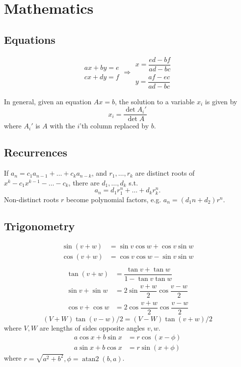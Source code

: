 
\chapter{Mathematics}

\section{Equations}


\[\begin{aligned}ax+by=e\\cx+dy=f\end{aligned}
\Rightarrow
\begin{aligned}x=\dfrac{ed-bf}{ad-bc}\\y=\dfrac{af-ec}{ad-bc}\end{aligned}\]

In general, given an equation $Ax = b$, the solution to a variable $x_i$ is given by
\[x_i = \frac{\det A_i'}{\det A} \]
where $A_i'$ is $A$ with the $i$'th column replaced by $b$.

\section{Recurrences}
If $a_n = c_1 a_{n-1} + \dots + c_k a_{n-k}$, and $r_1, \dots, r_k$ are distinct roots of $x^k - c_1 x^{k-1} - \dots - c_k$, there are $d_1, \dots, d_k$ s.t.
\[a_n = d_1r_1^n + \dots + d_kr_k^n. \]
Non-distinct roots $r$ become polynomial factors, e.g. $a_n = (d_1n + d_2)r^n$.

\section{Trigonometry}
\begin{align*}
\sin(v+w)&{}=\sin v\cos w+\cos v\sin w\\
\cos(v+w)&{}=\cos v\cos w-\sin v\sin w\\
\end{align*}
\begin{align*}
\tan(v+w)&{}=\dfrac{\tan v+\tan w}{1-\tan v\tan w}\\
\sin v+\sin w&{}=2\sin\dfrac{v+w}{2}\cos\dfrac{v-w}{2}\\
\cos v+\cos w&{}=2\cos\dfrac{v+w}{2}\cos\dfrac{v-w}{2}
\end{align*}
\[ (V+W)\tan(v-w)/2{}=(V-W)\tan(v+w)/2 \]
where $V, W$ are lengths of sides opposite angles $v, w$.
\begin{align*}
	a\cos x+b\sin x&=r\cos(x-\phi)\\
	a\sin x+b\cos x&=r\sin(x+\phi)
\end{align*}
where $r=\sqrt{a^2+b^2}, \phi=\operatorname{atan2}(b,a)$.

